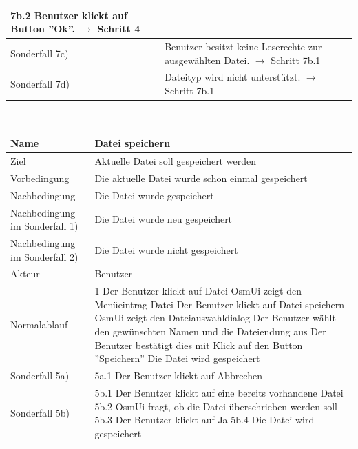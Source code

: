 \documentclass[a4paper,12pt]{scrartcl}
\begin{document}
\begin{center}
\begin{tabular}{|p{5cm}|p{10cm}|}
 7b.2 Benutzer klickt auf Button ''Ok''.
\newline
$ \rightarrow$ Schritt 4
\\
\hline Sonderfall 7c)& Benutzer besitzt keine Leserechte zur ausgewählten Datei.
\newline
$ \rightarrow$ Schritt 7b.1 
\\
\hline Sonderfall 7d)& Dateityp wird nicht unterstützt.
\newline
$ \rightarrow$ Schritt 7b.1 
\\
\hline 
\end{tabular} 
\vspace{0.7cm}
\\
\begin{tabular}{|p{5cm}|p{10cm}|}
\hline Name & \textbf{Datei speichern} \\ 
\hline Ziel & Aktuelle Datei soll gespeichert werden \\ 
\hline Vorbedingung & Die aktuelle Datei wurde schon einmal gespeichert \\ 
\hline Nachbedingung & Die Datei wurde gespeichert \\ 
\hline Nachbedingung im Sonderfall 1) & Die Datei wurde neu gespeichert \\ 
\hline Nachbedingung im Sonderfall 2) & Die Datei wurde nicht gespeichert\\
\hline Akteur & Benutzer \\ 
\hline Normalablauf & 1 Der Benutzer klickt auf Datei
\newline 2 OsmUi zeigt den Menüeintrag Datei
\newline 3 Der Benutzer klickt auf Datei speichern
\newline 4 OsmUi zeigt den Dateiauswahldialog
\newline 5 Der Benutzer wählt den gewünschten Namen und die Dateiendung aus
\newline 6 Der Benutzer bestätigt dies mit Klick auf den Button ''Speichern'' 
\newline 7 Die Datei wird gespeichert\\
\hline Sonderfall 5a) & 5a.1 Der Benutzer klickt auf Abbrechen\\
\hline Sonderfall 5b) & 5b.1 Der Benutzer klickt auf eine bereits vorhandene Datei
\newline 5b.2 OsmUi fragt, ob die Datei überschrieben werden soll
\newline 5b.3 Der Benutzer klickt auf Ja
\newline 5b.4 Die Datei wird gespeichert\\

\end{tabular}
\end{center}
\end{document}
